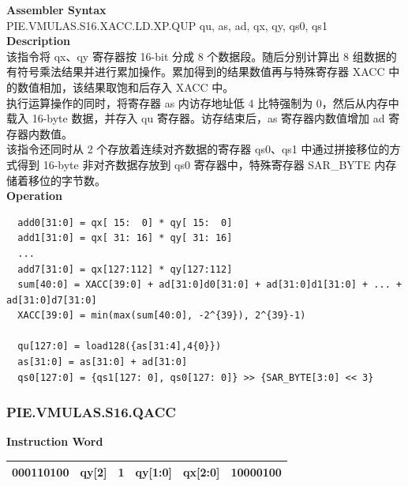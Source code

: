\textbf{Assembler Syntax} \\
PIE.VMULAS.S16.XACC.LD.XP.QUP qu, as, ad, qx, qy, qs0, qs1 \\
\textbf{Description} \\
该指令将 qx、qy 寄存器按 16-bit 分成 8 个数据段。随后分别计算出 8 组数据的有符号乘法结果并进行累加操作。累加得到的结果数值再与特殊寄存器 XACC 中的数值相加，该结果取饱和后存入 XACC 中。\\
执行运算操作的同时，将寄存器 as 内访存地址低 4 比特强制为 0，然后从内存中载入 16-byte 数据，并存入 qu 寄存器。访存结束后，as 寄存器内数值增加 ad 寄存器内数值。\\
该指令还同时从 2 个存放着连续对齐数据的寄存器 qs0、qs1 中通过拼接移位的方式得到 16-byte 非对齐数据存放到 qs0 寄存器中，特殊寄存器 SAR\_BYTE 内存储着移位的字节数。\\
\textbf{Operation}
\begin{lstlisting}
  add0[31:0] = qx[ 15:  0] * qy[ 15:  0]
  add1[31:0] = qx[ 31: 16] * qy[ 31: 16]
  ...
  add7[31:0] = qx[127:112] * qy[127:112]
  sum[40:0] = XACC[39:0] + ad[31:0]d0[31:0] + ad[31:0]d1[31:0] + ... + ad[31:0]d7[31:0]
  XACC[39:0] = min(max(sum[40:0], -2^{39}), 2^{39}-1)

  qu[127:0] = load128({as[31:4],4{0}})
  as[31:0] = as[31:0] + ad[31:0]
  qs0[127:0] = {qs1[127: 0], qs0[127: 0]} >> {SAR_BYTE[3:0] << 3}
\end{lstlisting}

\newpage
\subsubsection{PIE.VMULAS.S16.QACC}\label{instruction:PIEVMULASS16QACC}
\setlength\tabcolsep{6pt}
\textbf{Instruction Word} \\
\begin{tabular}{|c|c|c|c|c|c|}
	\hline
	000110100 & qy[2] & 1 & qy[1:0] & qx[2:0] & 10000100 \\
	\hline
\end{tabular}

